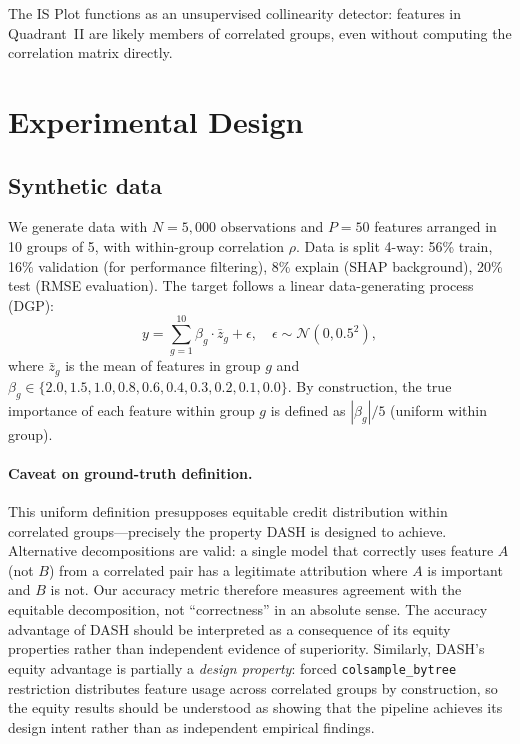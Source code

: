 \documentclass[11pt]{article}
\newcommand{\dash}{\textsc{DASH}}
\newcommand{\rhovar}{\rho}
\begin{document}
The IS Plot functions as an unsupervised collinearity detector: features
in Quadrant~II are likely members of correlated groups, even without
computing the correlation matrix directly.


\section{Experimental Design}
\label{sec:experiments}

\subsection{Synthetic data}

We generate data with $N = 5{,}000$ observations and $P = 50$ features
arranged in 10 groups of 5, with within-group correlation $\rhovar$.
Data is split 4-way: 56\% train, 16\% validation (for performance
filtering), 8\% explain (SHAP background), 20\% test (RMSE evaluation).
The target follows a linear data-generating process (DGP):
\begin{equation}
  y = \sum_{g=1}^{10} \beta_g \cdot \bar{z}_g + \epsilon,
  \quad \epsilon \sim \mathcal{N}(0, 0.5^2),
\end{equation}
where $\bar{z}_g$ is the mean of features in group $g$ and
$\beta_g \in \{2.0, 1.5, 1.0, 0.8, 0.6, 0.4, 0.3, 0.2, 0.1, 0.0\}$.
By construction, the true importance of each feature within group $g$ is
defined as $|\beta_g|/5$ (uniform within group).

\paragraph{Caveat on ground-truth definition.}
This uniform definition presupposes equitable credit distribution
within correlated groups---precisely the property \dash{} is designed
to achieve. Alternative decompositions are valid: a single model that
correctly uses feature $A$ (not $B$) from a correlated pair has a
legitimate attribution where $A$ is important and $B$ is not. Our
accuracy metric therefore measures agreement with the equitable
decomposition, not ``correctness'' in an absolute sense. The accuracy
advantage of \dash{} should be interpreted as a consequence of its
equity properties rather than independent evidence of superiority.
Similarly, \dash{}'s equity advantage is partially a \emph{design
property}: forced \texttt{colsample\_bytree} restriction distributes
feature usage across correlated groups by construction, so the equity
results should be understood as showing that the pipeline achieves
its design intent rather than as independent empirical findings.
\end{document}
